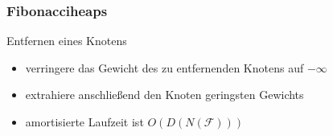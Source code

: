 \documentclass[aspectratio=1610, 11pt]{beamer}
\newcommand\cF{\mathcal F}
\newcommand{\mytitle}{Fibonacciheaps}
\begin{document}
\begin{frame}\frametitle{\mytitle}
	\begin{overprint}
		\begin{exampleblock}{Entfernen eines Knotens}
			\begin{itemize}
				\item verringere das Gewicht des zu entfernenden Knotens auf $-\infty$
				\item extrahiere anschlie\ss end den Knoten geringsten Gewichts
				\item amortisierte Laufzeit ist $O(D(N(\cF)))$
			\end{itemize}
		\end{exampleblock}	
	\end{overprint}
\end{frame}
\end{document}

